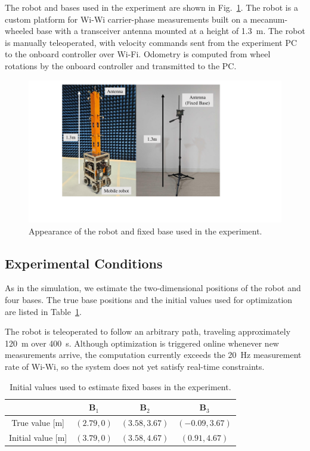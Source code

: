 \documentclass[conference]{IEEEtran}
\begin{document}
The robot and bases used in the experiment are shown in Fig.~\ref{fig:robot}.
The robot is a custom platform for Wi-Wi carrier-phase measurements built on a mecanum-wheeled base with a transceiver antenna mounted at a height of 1.3~m.
The robot is manually teleoperated, with velocity commands sent from the experiment PC to the onboard controller over Wi-Fi.
Odometry is computed from wheel rotations by the onboard controller and transmitted to the PC.

\begin{figure}
    \centering
    \includegraphics[width=0.95\linewidth]{figures/robot}
    \caption{Appearance of the robot and fixed base used in the experiment.}
    \label{fig:robot}
\end{figure}

\subsection{Experimental Conditions}
As in the simulation, we estimate the two-dimensional positions of the robot and four bases.
The true base positions and the initial values used for optimization are listed in Table~\ref{tab:initial_real}.

The robot is teleoperated to follow an arbitrary path, traveling approximately 120~m over 400~s.
Although optimization is triggered online whenever new measurements arrive, the computation currently exceeds the 20~Hz measurement rate of Wi-Wi, so the system does not yet satisfy real-time constraints.

\begin{table}
    \centering
    \caption{Initial values used to estimate fixed bases in the experiment.}
    \begin{tabular}{|c|c|c|c|}
    \hline
        & $\mathbf{B}_1$ & $\mathbf{B}_2$ & $\mathbf{B}_3$ \\
    \hline
       True value [m]  &$(2.79,0)$  &$(3.58,3.67)$ &$(-0.09,3.67)$ \\
       Initial value [m] &$(3.79,0)$  &$(3.58,4.67)$ &$(0.91,4.67)$ \\
    \hline
    \end{tabular}
    \label{tab:initial_real}
\end{table}
\end{document}
